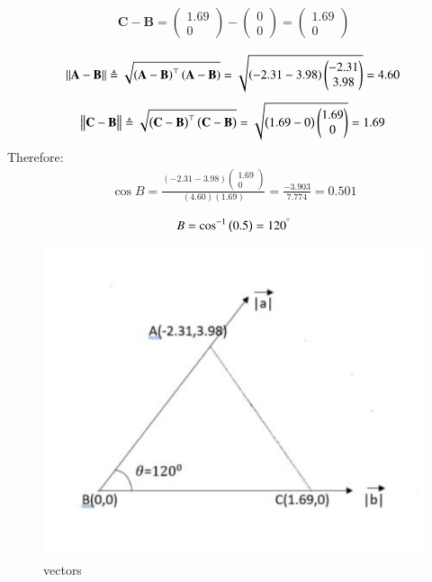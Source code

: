 \documentclass[12pt,-letter paper]{article}
\let\vec\mathbf{}
\let\vec\mathbf{}
\let\vec\mathbf{}
\providecommand{\brak}[1]{\ensuremath{\left(#1\right)}}
\newcommand{\myvec}[1]{\ensuremath{\begin{pmatrix}#1\end{pmatrix}}}
\providecommand{\brak}[1]{\ensuremath{\left(#1\right)}}
\begin{document}
\begin{enumerate}
  \begin{align}
\vec{C} - \vec{B} = \myvec{1.69 \\ 0}-\myvec{0 \\ 0} = \myvec{ 1.69\\ 0 }\\
 \end{align}
  \begin{align}
\norm{\vec{A}-\vec{B}} \triangleq \sqrt{\brak{\vec{A}-\vec{B}}^{\top}\brak{\vec{A}-\vec{B}}} = \sqrt{\brak{{-2.31}-{3.98}}{\myvec{-2.31\\3.98}}} = 4.60\\
 \end{align}
  \begin{align}
\norm{\vec{C}-\vec{B}} \triangleq \sqrt{\brak{\vec{C}-\vec{B}}^{\top}\brak{\vec{C}-\vec{B}}} = \sqrt{\brak{{1.69}-{0}}{\myvec{1.69\\0}}} = 1.69\\
  \end{align}
Therefore:\\
 \begin{align}
\cos{B}=\frac{\brak{{-2.31}-{3.98}}{\myvec{1.69\\0}}}{\brak{4.60}\brak{1.69}} = \frac{-3.903}{7.774} = {0.501}\\
 \end{align}
  \begin{align}
 {B}=\cos^{-1}\brak{0.5} = 120^\degree
 \end{align}
 \begin{figure}[!h]
        \centering
        \includegraphics[width=\columnwidth]{math.jpeg}
        \caption{vectors}
        \label{fig:figure}
    \end{figure}
    
  \end{enumerate}
\end{document}
